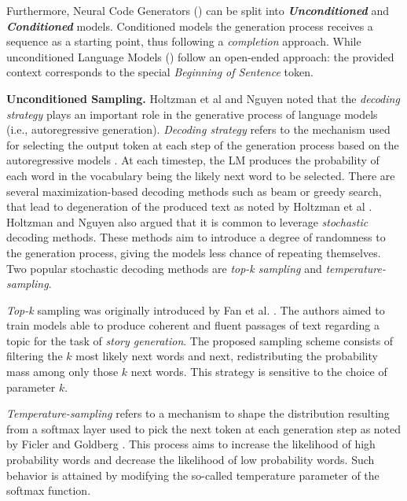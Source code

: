 Furthermore, Neural Code Generators (\ncg) can be split into \textit{\textbf{Unconditioned}} and \textit{\textbf{Conditioned}} models. Conditioned models the generation process receives a sequence as a starting point, thus following a \textit{completion} approach. While unconditioned Language Models (\ulm) follow an open-ended approach: the provided context corresponds to the special \textit{Beginning of Sentence} token.

\textbf{Unconditioned Sampling.} Holtzman et al \citep{Holtzman2019} and Nguyen \citep{Nguyen2021} noted that the \textit{decoding strategy} plays an important role in the generative process of language models (i.e., autoregressive generation). \textit{Decoding strategy} refers to the mechanism used for selecting the output token at each step of the generation process based on the autoregressive models \citep{Holtzman2019}.  At each timestep, the LM produces the probability of each word in the vocabulary being the likely next word to be selected. There are several maximization-based decoding methods such as beam or greedy search, that lead to degeneration of the produced text as noted by Holtzman et al \cite{Holtzman2019}. Holtzman\citep{Holtzman2019} and Nguyen \cite{Nguyen2021} also argued that it is common to leverage \textit{stochastic} decoding methods. These methods aim to introduce a degree of randomness to the generation process, giving the models less chance of repeating themselves. Two popular stochastic decoding methods are \textit{top-k sampling} and \textit{temperature-sampling}.

\textit{Top-k} sampling was originally introduced by Fan et al. \citep{Fan2018}. The authors aimed to train models able to produce coherent and fluent passages of text regarding a topic for the task of \textit{story generation}. The proposed sampling scheme consists of filtering  the $k$ most likely next words and next, redistributing the probability mass among only those $k$ next words. This strategy is sensitive to the choice of parameter $k$.

\textit{Temperature-sampling} refers to a mechanism to shape the distribution resulting from a softmax layer used to pick the next token at each generation step as noted by Ficler and Goldberg \citep{Ficler}. This process aims to increase the likelihood of high probability words and decrease the likelihood of low probability words. Such behavior is attained by modifying the so-called temperature parameter of the softmax function.